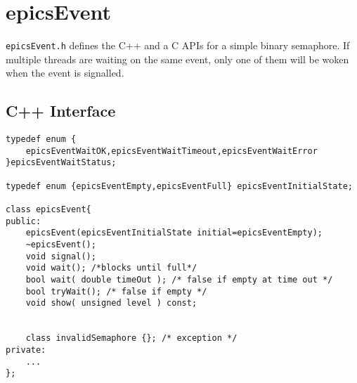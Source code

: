 \section{epicsEvent}

\verb|epicsEvent.h| defines the C++ and a C APIs for a simple binary semaphore.
If multiple threads are waiting on the same event, only one of them will be woken when the event is signalled.

\subsection{C++ Interface}

\begin{verbatim}
typedef enum {
    epicsEventWaitOK,epicsEventWaitTimeout,epicsEventWaitError
}epicsEventWaitStatus;

typedef enum {epicsEventEmpty,epicsEventFull} epicsEventInitialState;

class epicsEvent{
public:
    epicsEvent(epicsEventInitialState initial=epicsEventEmpty);
    ~epicsEvent();
    void signal();
    void wait(); /*blocks until full*/
    bool wait( double timeOut ); /* false if empty at time out */
    bool tryWait(); /* false if empty */
    void show( unsigned level ) const;


    class invalidSemaphore {}; /* exception */
private:
    ...
};
\end{verbatim}

